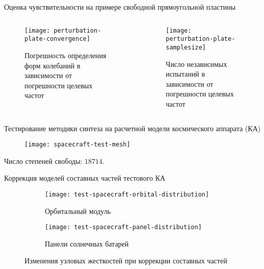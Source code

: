 \begin{frame}{Оценка чувствительности на примере свободной прямоугольной пластины}
	\begin{center}	
		\begin{columns}
			\begin{column}{0.5\textwidth}
				\centering
				\begin{figure}
					\texttt{[image: perturbation-plate-convergence]}
					\caption{Погрешность определения форм колебаний в зависимости от погрешности целевых частот}
				\end{figure}
			\end{column}
			\begin{column}{0.5\textwidth}
				\centering
				\vspace{-0.9em}
				\begin{figure}
					\texttt{[image: perturbation-plate-samplesize]}
					\caption{Число независимых испытаний в зависимости от погрешности целевых частот}
				\end{figure}
			\end{column}
		\end{columns}
	\end{center}
\end{frame}

\begin{frame}{Тестирование методики синтеза на расчетной модели космического аппарата (КА)}
	\begin{figure}
		\centering
		\texttt{[image: spacecraft-test-mesh]}
	\end{figure}
	Число степеней свободы: $ 18714 $.
\end{frame}

\begin{frame}{Коррекция моделей составных частей тестового КА}
	\begin{figure}
		\centering
		\begin{subfigure}[t]{0.45\textwidth}
			\centering
			\texttt{[image: test-spacecraft-orbital-distribution]}
			\caption{Орбитальный модуль} 
		\end{subfigure}
		\hfill
		\begin{subfigure}[t]{0.45\textwidth}
			\centering
			\texttt{[image: test-spacecraft-panel-distribution]}
			\caption{Панели солнечных батарей} 
		\end{subfigure} 
		\caption{Изменения узловых жесткостей при коррекции составных частей}
	\end{figure}	
\end{frame}


